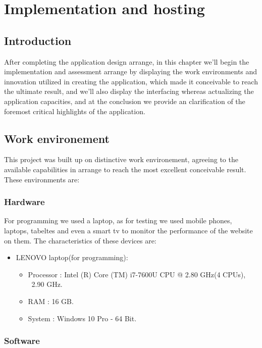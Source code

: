 \chapter{Implementation and hosting}

\section{Introduction}
After completing the application design arrange, in this chapter we'll begin the implementation and assessment arrange by displaying the work environments and innovation utilized in creating the application, which made it conceivable to reach the ultimate result, and we'll also display the interfacing whereas actualizing the application capacities, and at the conclusion we provide an clarification of the foremost critical highlights of the application. \\


\section{Work environement}
This project was built up on distinctive work environement, agreeing to the available capabilities in arrange to reach the most excellent conceivable result. These environments are:\\

\subsection{Hardware}
For programming we used a laptop, as for testing we used mobile phones, laptops, tabeltes and even a smart tv to monitor the performance of the website on them. The characteristics of
these devices are:
\begin{itemize}
	\item LENOVO laptop(for programming):
	\begin{itemize}
		\item Processor : Intel (R) Core (TM) i7-7600U CPU @ 2.80 GHz(4 CPUs), ~2.90 GHz.
		\item RAM : 16 GB.
		\item System : Windows 10 Pro - 64 Bit.
	\end{itemize}
\end{itemize}



\subsection{Software}

